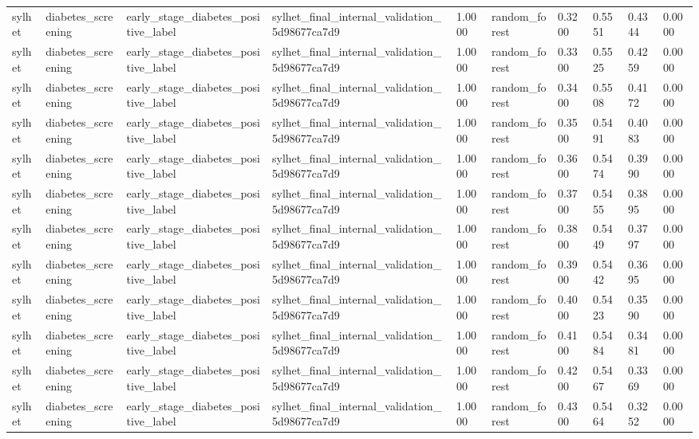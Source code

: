 \begin{tabular}{llllllllll}
sylhet & diabetes\_screening & early\_stage\_diabetes\_positive\_label & sylhet\_final\_internal\_validation\_5d98677ca7d9 & 1.0000 & random\_forest & 0.3200 & 0.5551 & 0.4344 & 0.0000 \\
sylhet & diabetes\_screening & early\_stage\_diabetes\_positive\_label & sylhet\_final\_internal\_validation\_5d98677ca7d9 & 1.0000 & random\_forest & 0.3300 & 0.5525 & 0.4259 & 0.0000 \\
sylhet & diabetes\_screening & early\_stage\_diabetes\_positive\_label & sylhet\_final\_internal\_validation\_5d98677ca7d9 & 1.0000 & random\_forest & 0.3400 & 0.5508 & 0.4172 & 0.0000 \\
sylhet & diabetes\_screening & early\_stage\_diabetes\_positive\_label & sylhet\_final\_internal\_validation\_5d98677ca7d9 & 1.0000 & random\_forest & 0.3500 & 0.5491 & 0.4083 & 0.0000 \\
sylhet & diabetes\_screening & early\_stage\_diabetes\_positive\_label & sylhet\_final\_internal\_validation\_5d98677ca7d9 & 1.0000 & random\_forest & 0.3600 & 0.5474 & 0.3990 & 0.0000 \\
sylhet & diabetes\_screening & early\_stage\_diabetes\_positive\_label & sylhet\_final\_internal\_validation\_5d98677ca7d9 & 1.0000 & random\_forest & 0.3700 & 0.5455 & 0.3895 & 0.0000 \\
sylhet & diabetes\_screening & early\_stage\_diabetes\_positive\_label & sylhet\_final\_internal\_validation\_5d98677ca7d9 & 1.0000 & random\_forest & 0.3800 & 0.5449 & 0.3797 & 0.0000 \\
sylhet & diabetes\_screening & early\_stage\_diabetes\_positive\_label & sylhet\_final\_internal\_validation\_5d98677ca7d9 & 1.0000 & random\_forest & 0.3900 & 0.5442 & 0.3695 & 0.0000 \\
sylhet & diabetes\_screening & early\_stage\_diabetes\_positive\_label & sylhet\_final\_internal\_validation\_5d98677ca7d9 & 1.0000 & random\_forest & 0.4000 & 0.5423 & 0.3590 & 0.0000 \\
sylhet & diabetes\_screening & early\_stage\_diabetes\_positive\_label & sylhet\_final\_internal\_validation\_5d98677ca7d9 & 1.0000 & random\_forest & 0.4100 & 0.5484 & 0.3481 & 0.0000 \\
sylhet & diabetes\_screening & early\_stage\_diabetes\_positive\_label & sylhet\_final\_internal\_validation\_5d98677ca7d9 & 1.0000 & random\_forest & 0.4200 & 0.5467 & 0.3369 & 0.0000 \\
sylhet & diabetes\_screening & early\_stage\_diabetes\_positive\_label & sylhet\_final\_internal\_validation\_5d98677ca7d9 & 1.0000 & random\_forest & 0.4300 & 0.5464 & 0.3252 & 0.0000 \\

\end{tabular}
